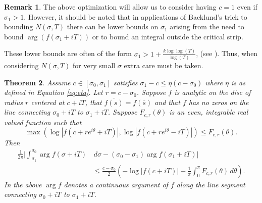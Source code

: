 \documentclass[10pt,english,letter, reqno]{amsart}
\theoremstyle{plain}
\newtheorem{theorem}{Theorem}
\theoremstyle{definition}
\newtheorem{remark}[theorem]{Remark}
\begin{document}
\begin{remark}
The above optimization will allow us to consider having $c=1$ even if $\sigma_1>1$. However, it should be noted that in applications of Backlund's trick to bounding $N(\sigma,T)$ there can be lower bounds on $\sigma_1$ arising from the need to bound $\arg(f(\sigma_1+iT))$ or to bound an integral outside the critical strip. 

These lower bounds are often of the form $\sigma_1>1+\frac{k\log\log(T)}{\log(T)}$, (see \cite{Farzanfard2024}). Thus, when considering $N(\sigma,T)$ for very small $\sigma$ extra care must be taken. 
\end{remark}

\begin{theorem}\label{thm:arg-integrals}
Assume $c\in [\sigma_0,\sigma_1]$ satisfies $\sigma_1 - c \leq \eta(c-\sigma_0) $ where $\eta$ is as defined in Equation \eqref{eq:eta}.
Let $r=c-\sigma_0$.
Suppose $f$ is analytic on the disc of radius $r$ centered at $c+iT$, that $\overline{f(s)} = f(\overline{s})$ and that $f$ has no zeros on the line connecting $\sigma_0+iT$ to $\sigma_1+iT$.
 Suppose $F_{c,r}(\theta)$ is an even, integrable real valued function such that
\[ \max\left(\log|f(c+re^{i\theta}+iT)|,\log|f(c+re^{i\theta}-iT)|\right) \leq F_{c,r}(\theta). \]
Then 
\begin{align*} \frac{1}{2\pi}\Biggl| \int_{\sigma_1}^{\sigma_0} \arg f(\sigma+iT)&\,d\sigma - (\sigma_0 - \sigma_1)\arg f(\sigma_1+iT)\Biggr| \\
 &\leq
\frac{c - \sigma_0}{2}\left(
-  \log|f(c+iT)| 
+ \frac{1}{\pi}\int_{0}^{\pi} F_{c,r}(\theta)\,d\theta \right).
\end{align*}
In the above $\arg f$ denotes a continuous argument of $f$ along the line segment connecting $\sigma_0+iT$ to $\sigma_1+iT$.
\end{theorem}
\end{document}
